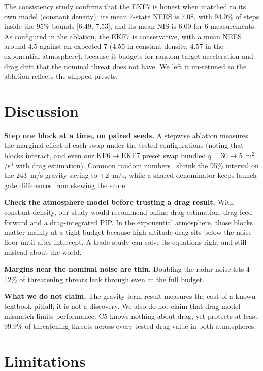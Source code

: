 \documentclass[conference,letterpaper]{IEEEtran}
\begin{document}
The consistency study confirms that the EKF7 is honest when matched to its own model (constant density): its mean 7-state NEES is 7.08, with 94.0\% of steps inside the 95\% bounds [6.49, 7.53], and its mean NIS is 6.00 for 6 measurements.
As configured in the ablation, the EKF7 is conservative, with a mean NEES around 4.5 against an expected 7 (4.55 in constant density, 4.57 in the exponential atmosphere), because it budgets for random target acceleration and drag drift that the nominal threat does not have.
We left it un-retuned so the ablation reflects the shipped presets.

\section{Discussion}
\label{sec:discussion}

\textbf{Step one block at a time, on paired seeds.}
A stepwise ablation measures the marginal effect of each swap under the tested configurations (noting that blocks interact, and even our KF6$\to$EKF7 preset swap bundled $q = 30\to5$~m$^2$/s$^3$ with drag estimation).
Common random numbers~\cite{glasserman1992} shrink the 95\% interval on the 243~m/s gravity saving to $\pm$2~m/s, while a shared denominator keeps launch-gate differences from skewing the score.

\textbf{Check the atmosphere model before trusting a drag result.}
With constant density, our study would recommend online drag estimation, drag feed-forward and a drag-integrated PIP.
In the exponential atmosphere, those blocks matter mainly at a tight budget because high-altitude drag sits below the noise floor until after intercept.
A trade study can solve its equations right and still mislead about the world.

\textbf{Margins near the nominal noise are thin.}
Doubling the radar noise lets 4--12\% of threatening threats leak through even at the full budget.

\textbf{What we do not claim.}
The gravity-term result measures the cost of a known textbook pitfall; it is not a discovery.
We also do not claim that drag-model mismatch limits performance: C5 knows nothing about drag, yet protects at least 99.9\% of threatening threats across every tested drag value in both atmospheres.

\section{Limitations}
\label{sec:limitations}
\end{document}
